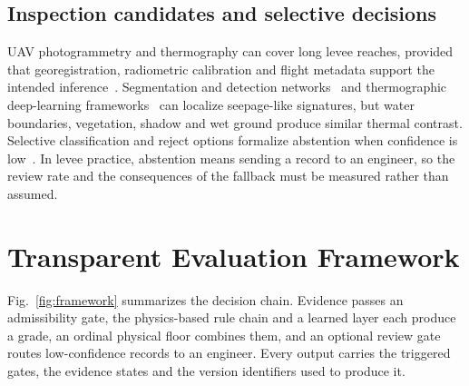 \documentclass[journal]{IEEEtran}
\begin{document}
\subsection{Inspection candidates and selective decisions}
UAV photogrammetry and thermography can cover long levee reaches, provided that georegistration, radiometric calibration and flight metadata support the intended inference~\cite{Colomina2014}. Segmentation and detection networks~\cite{Ronneberger2015,Redmon2016} and thermographic deep-learning frameworks~\cite{Kumar2025} can localize seepage-like signatures, but water boundaries, vegetation, shadow and wet ground produce similar thermal contrast. Selective classification and reject options formalize abstention when confidence is low~\cite{Chow1970,Geifman2017}. In levee practice, abstention means sending a record to an engineer, so the review rate and the consequences of the fallback must be measured rather than assumed.

\section{Transparent Evaluation Framework}
\label{sec:framework}
Fig.~\ref{fig:framework} summarizes the decision chain. Evidence passes an admissibility gate, the physics-based rule chain and a learned layer each produce a grade, an ordinal physical floor combines them, and an optional review gate routes low-confidence records to an engineer. Every output carries the triggered gates, the evidence states and the version identifiers used to produce it.
\end{document}
